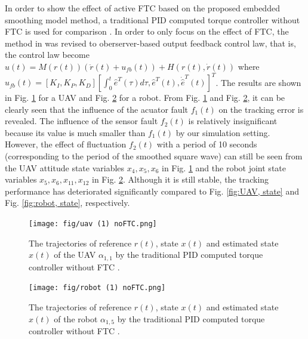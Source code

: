 \documentclass{ieeeaccess}
\begin{document}
In order to show the effect of active FTC based on the proposed embedded smoothing model method, a traditional PID computed torque controller without FTC is used for comparison \cite{7456706}. In order to only focus on the effect of FTC, the method in \cite{7456706} was revised to oberserver-based output feedback control law, that is, the control law become $u(t)= M(r(t))(\ddot{r}(t) + u_{fb}(t)) + H(r(t),\dot{r}(t))$ where $u_{fb}(t) = [K_I, K_P, K_D][\int_{0}^{t}\hat{e}^T(\tau)d\tau, \hat{e}^T(t), \dot{\hat{e}}^T(t)]^T$. The results are shown in Fig. \ref{fig:uav, state, noFTC} for a UAV and Fig. \ref{fig:robot, state, noFTC} for a robot. From Fig. \ref{fig:uav, state, noFTC} and Fig. \ref{fig:robot, state, noFTC}, it can be clearly seen that the influence of the acuator fault $f_1(t)$ on the tracking error is revealed. The influence of the sensor fault $f_2(t)$ is relatively insignificant because its value is much smaller than $f_1(t)$ by our simulation setting. However, the effect of fluctuation $f_2(t)$ with a period of 10 seconds (corresponding to the period of the smoothed square wave) can still be seen from the UAV attitude state variables $x_4,x_5,x_6$ in Fig. \ref{fig:uav, state, noFTC} and the robot joint state variables $x_5,x_6,x_{11},x_{12}$ in Fig. \ref{fig:robot, state, noFTC}. Although it is still stable, the tracking performance has deteriorated significantly compared to Fig. \ref{fig:UAV, state} and Fig. \ref{fig:robot, state}, respectively.
\begin{figure}[htbp]
    \centering
    \texttt{[image: fig/uav (1) noFTC.png]}\caption{The trajectories of reference $r(t)$, state $x(t)$ and estimated state $\hat{x}(t)$ of the UAV $\alpha_{1,1}$ by the traditional PID computed torque controller without FTC \cite{7456706}.}%
    \label{fig:uav, state, noFTC}
\end{figure}
\begin{figure}[htbp]
    \centering
    \texttt{[image: fig/robot (1) noFTC.png]}\caption{The trajectories of reference $r(t)$, state $x(t)$ and estimated state $\hat{x}(t)$ of the robot $\alpha_{1,5}$ by the traditional PID computed torque controller without FTC \cite{7456706}.}%
    \label{fig:robot, state, noFTC}
\end{figure}
\end{document}
